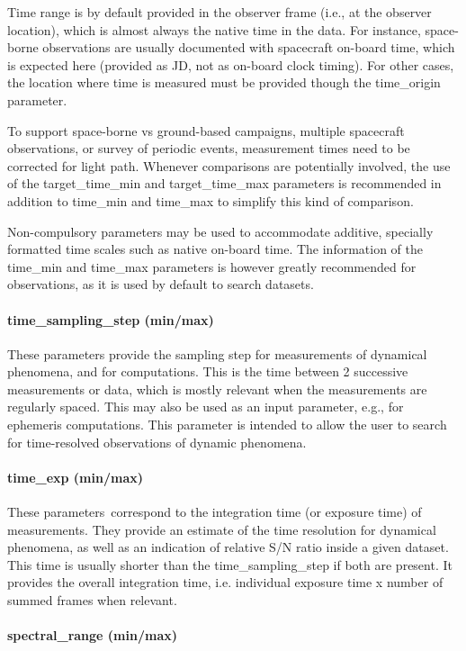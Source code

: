 \documentclass[11pt,a4paper]{ivoa}
\begin{document}
Time range is by default provided in the observer frame (i.e., at the observer location), which is almost always the native time in the data. For instance, space-borne observations are usually documented with spacecraft on-board time, which is expected here (provided as JD, not as on-board clock timing). For other cases, the location where time is measured must be provided though the time\_origin parameter.

To support space-borne vs ground-based campaigns, multiple spacecraft observations, or survey of periodic events, measurement times need to be corrected for light path. Whenever comparisons are potentially involved, the use of the target\_time\_min and target\_time\_max parameters is recommended in addition to time\_min and time\_max to simplify this kind of comparison.

Non-compulsory parameters may be used to accommodate additive, specially formatted time scales such as native on-board time. The information of the time\_min and time\_max parameters is however greatly recommended for observations, as it is used by default to search datasets.

\paragraph{time\_sampling\_step (min/max)}

These parameters provide the sampling step for measurements of dynamical phenomena, and for computations. This is the time between 2 successive measurements or data, which is mostly relevant when the measurements are regularly spaced. This may also be used as an input parameter, e.g., for ephemeris computations. This parameter is intended to allow the user to search for time-resolved observations of dynamic phenomena.

\paragraph{time\_exp (min/max)}

These parameters correspond to the integration time (or exposure time) of measurements. They provide an estimate of the time resolution for dynamical phenomena, as well as an indication of relative S/N ratio inside a given dataset. This time is usually shorter than the time\_sampling\_step if both are present. It provides the overall integration time, i.e. individual exposure time x number of summed frames when relevant. 

\paragraph{spectral\_range (min/max)}
\end{document}
